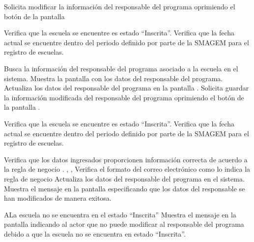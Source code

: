  \begin{UCtrayectoria}
    \UCpaso[\UCactor] Solicita modificar la información del responsable del programa oprimiendo el botón \botEdit de la pantalla 

    \UCpaso[\UCsist] Verifica que la escuela se encuentre es estado ``Inscrita''. 
    \UCpaso[\UCsist] Verifica que la fecha actual se encuentre dentro del periodo definido por parte de la SMAGEM para el registro de escuelas. 
    
    \UCpaso[\UCsist] Busca la información del responsable del programa asociado a la escuela en el sistema. 
    \UCpaso[\UCsist] Muestra la pantalla  con los datos del responsable del programa.
    \UCpaso[\UCactor] Actualiza los datos del responsable del programa en la pantalla . \label{cur11:Acciones} 
    \UCpaso[\UCactor] Solicita guardar la información modificada del responsable del programa oprimiendo el botón  de la pantalla  . 

    \UCpaso[\UCsist] Verifica que la escuela se encuentre es estado ``Inscrita''. 
    \UCpaso[\UCsist] Verifica que la fecha actual se encuentre dentro del periodo definido por parte de la SMAGEM para el registro de escuelas.     
    
    \UCpaso[\UCsist] Verifica que los datos ingresados proporcionen información correcta de acuerdo a la regla de negocio .  , , 
   \UCpaso[\UCsist]Verifica el formato del correo electrónico como lo indica la regla de negocio   %
    \UCpaso[\UCsist] Actualiza los datos del responsable del programa en el sistema.
    \UCpaso[\UCsist] Muestra el mensaje  en la pantalla  especificando que los datos del responsable se han modificados de manera exitosa.

 \end{UCtrayectoria}

 \begin{UCtrayectoriaA}{A}{La escuela no se encuentra en el estado ``Inscrita''}
    \UCpaso[\UCsist] Muestra el mensaje  en la pantalla  indicando al actor que no puede modificar al responsable del programa debido a que la escuela no se encuentra en estado ``Inscrita''.
 \end{UCtrayectoriaA}

